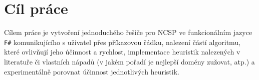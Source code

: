 \chapter{Cíl práce}
Cílem práce je vytvoření jednoduchého řešiče pro NCSP ve funkcionálním jazyce \texttt{F\#} komunikujícího s uživatel přes příkazovou řádku, nalezení částí algoritmu, které ovlivňují jeho účinnost a rychlost, implementace heuristik nalezených v literatuře či vlastních nápadů (v jakém pořadí je nejlepší domény zužovat, atp.) a experimentálně porovnat účinnost jednotlivých heuristik.